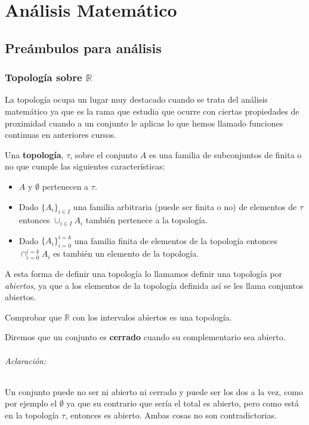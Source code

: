 \part{Análisis Matemático}
\chapter{Preámbulos para análisis}
\minitoc

\newpage
\section{Topología sobre $\mathbb{R}$}
La topología ocupa un lugar muy destacado cuando se trata del análisis matemático ya que es la rama que estudia que ocurre con ciertas propiedades de proximidad cuando a un conjunto le aplicas lo que hemos llamado funciones continuas en anteriores cursos. 

\begin{defi}
Una \textbf{topología}, $\tau$, sobre el conjunto $A$  es una familia de subconjuntos de  finita o no que cumple las siguientes características:
\begin{itemize}
\item $A$ y $\emptyset$ pertenecen a $\tau$.
\item Dado $\lbrace A_i \rbrace_{i\in I}$ una familia arbitraria (puede ser finita o no) de elementos de $\tau$ entonces $\cup_{i\in I} A_i$ también pertenece a la topología.
\item Dado $\lbrace A_i \rbrace_{i=0}^{i=k}$ una familia finita de elementos de la topología entonces $\cap_{i=0}^{i=k} A_i$ es también un elemento de la topología.
\end{itemize}

A esta forma de definir una topología lo llamamos definir una topología por \emph{abiertos}, ya que a los elementos de la topología definida así se les llama conjuntos abiertos. 
\end{defi}
\begin{ejercicio}
Comprobar que $\mathbb{R}$ con los intervalos abiertos es una topología. 
\end{ejercicio}

\begin{defi}
Diremos que un conjunto es \textbf{cerrado} cuando su complementario sea abierto. 
\end{defi}

\paragraph*{Aclaración: } Un conjunto puede no ser ni abierto ni cerrado y puede ser los dos a la vez, como por ejemplo el $\emptyset$ ya que su contrario que sería el total es abierto, pero como está en la topología $\tau$, entonces es abierto. Ambas cosas no son contradictorias. 

